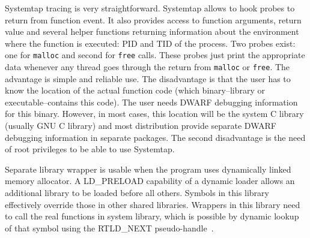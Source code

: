 Systemtap tracing is very straightforward. Systemtap allows to hook probes to return from function event. It also provides access to function arguments, return value and several helper functions returning information about the environment where the function is executed: PID and TID of the process. Two probes exist: one for {\tt malloc} and second for {\tt free} calls. These probes just print the appropriate data whenever any thread goes through the return from {\tt malloc} or {\tt free}. The advantage is simple and reliable use. The disadvantage is that the user has to know the location of the actual function code (which binary--library or executable--contains this code). The user needs DWARF debugging information for this binary. However, in most cases, this location will be the system C library (usually GNU C library) and most distribution provide separate DWARF debugging information in separate packages. The second disadvantage is the need of root privileges to be able to use Systemtap.

Separate library wrapper is usable when the program uses dynamically linked memory allocator. A LD\_PRELOAD capability of a dynamic loader allows an additional library to be loaded before all others. Symbols in this library effectively override those in other shared libraries. Wrappers in this library need to call the real functions in system library, which is possible by dynamic lookup of that symbol using the RTLD\_NEXT pseudo-handle~\cite{RTLD_NEXT}. 




